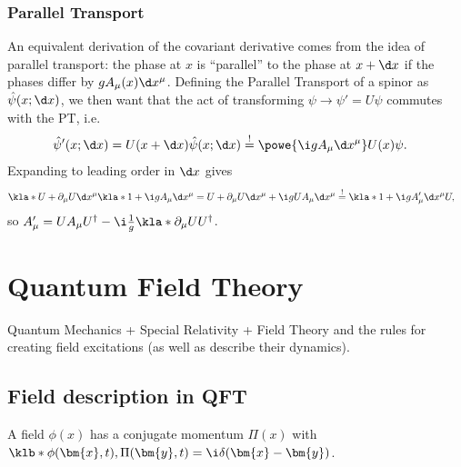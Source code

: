 \documentclass[english, parskip=full]{scrbook}
\begin{document}
\subsection{Parallel Transport}
An equivalent derivation of the covariant derivative comes from the idea of parallel transport: the phase at $x$ is \enquote{parallel} to the phase at $x+\d x$ if the phases differ by $gA_\mu(x)\d x^\mu$.
Defining the Parallel Transport of a spinor as $\hat{\psi}(x;\d x)$, we then want that the act of transforming $\psi\rightarrow\psi'=U\psi$ commutes with the PT, i.e.
\begin{align}
\hat{\psi}'(x;\d x) &= U(x+\d x) \hat{\psi}(x; \d x)\overset{!}{=} \powe{\i g A_\mu \d x^\mu} U(x)\psi.
\end{align}
Expanding to leading order in $\d x$ gives
\begin{align}
\kla*{U + \partial_\mu U \d x^\mu }\kla*{1 + \i g A_\mu \d x^\mu } &= U + \partial_\mu U \d x^\mu + \i g U A_\mu \d x^\mu \overset{!}{=}  \kla*{1 + \i g A'_\mu \d x^\mu} U, 
\end{align}
so $A'_\mu = U A_\mu U^\dagger - \i \frac{1}{g} \kla*{\partial_\mu U}U^\dagger$.
\chapter{Quantum Field Theory}
Quantum Mechanics + Special Relativity + Field Theory and the rules for creating field excitations (as well as describe their dynamics).
\section{Field description in QFT}
A field $\phi(x)$ has a conjugate momentum $\Pi(x)$ with $\klb*{\phi(\bm{x},t),\Pi(\bm{y},t)} = \i\delta(\bm{x}-\bm{y})$.
\end{document}
